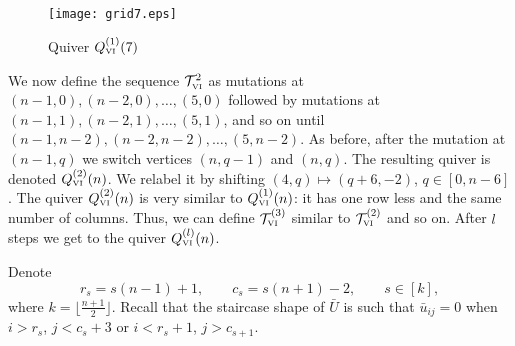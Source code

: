 \documentclass{amsart}
\theoremstyle{definition}
\theoremstyle{remark}
\numberwithin{equation}{section}
\numberwithin{theorem}{section}
\begin{document}
  \begin{figure}[ht]
\begin{center}
\texttt{[image: grid7.eps]}
\caption{Quiver $Q_{\mbox{\tiny\rm VI}}^{(1)}(7)$}
\label{fig:grid7}
\end{center}
\end{figure} 

We now define the sequence ${{\mathcal T}}^2_{\mbox{\tiny\rm VI}}$ as mutations at $(n-1,0), (n-2,0),\dots, (5,0)$
followed by mutations at $(n-1,1), (n-2,1),\dots,(5,1)$, and so on until $(n-1,n-2), (n-2,n-2),\dots,(5,n-2)$. As before, after the mutation at $(n-1,q)$ we 
switch vertices $(n,q-1)$ and $(n,q)$. The resulting quiver is denoted $Q^{(2)}_{\mbox{\tiny\rm VI}}(n)$. We relabel it by shifting
 $(4,q)\mapsto (q+6,-2)$, $q\in [0,n-6]$. The quiver $Q^{(2)}_{\mbox{\tiny\rm VI}}(n)$ is very similar to
 $Q^{(1)}_{\mbox{\tiny\rm VI}}(n)$: it has one row less and the same number of columns. Thus, we can define
 ${{\mathcal T}}^{(3)}_{\mbox{\tiny\rm VI}}$ similar to ${{\mathcal T}}^{(2)}_{\mbox{\tiny\rm VI}}$ and so on. After $l$ steps we get to the quiver
 $Q^{(l)}_{\mbox{\tiny\rm VI}}(n)$.

Denote
$$
r_s = s (n-1) +1,\qquad c_s = s(n+1) -2, \qquad s\in [k],
$$
where $k=\lfloor\frac{n+1}2\rfloor$.
Recall that the staircase shape of $\bar U$ is such that $\bar u_{ij}=0$ when $i> r_s$, $j < c_s + 3$ or $i < r_s + 1$, $j > c_{s+1}$.
\end{document}

